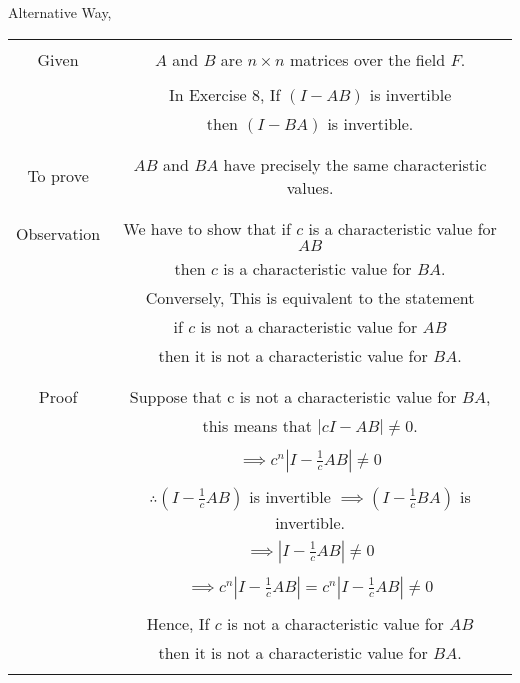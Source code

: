 \documentclass[journal,12pt,twocolumn]{IEEEtran}
\begin{document}
Alternative Way, 
\begin{table}[h!]
\begin{center}
\resizebox{\columnwidth}{!}
{
\begin{tabular}{|c|c|}
\hline
& \\
Given & $A$ and $B$ are $n \times n$ matrices over the field $F$.\\
& \\
& In Exercise 8, If $(I-AB)$ is invertible\\
& then $(I-BA)$ is invertible.\\
&\\
\hline
& \\
To prove & $AB$ and $BA$ have precisely the same characteristic values.\\
& \\
\hline
&\\
Observation & We have to show that if $c$ is a characteristic value for $AB$ \\
& then $c$ is a characteristic value for $BA$.\\
& Conversely, This is equivalent to the statement\\
& if $c$ is not a characteristic value for $AB$\\
& then it is not a characteristic value for $BA$.\\
& \\
\hline
& \\
Proof  & Suppose that c is not a characteristic value for $BA$,\\
& this means that $|cI-AB|\neq0$.\\
& \\
& $\implies c^n|I-\frac{1}{c}AB|\neq0$\\
& \\
& $\therefore (I-\frac{1}{c}AB)$ is invertible $\implies (I-\frac{1}{c}BA)$ is invertible.\\
& $\implies |I-\frac{1}{c}AB|\neq0$\\
& \\
& $\implies c^n|I-\frac{1}{c}AB|=c^n|I-\frac{1}{c}AB|\neq0$\\
& \\
& Hence, If $c$ is not a characteristic value for $AB$\\
& then it is not a characteristic value for $BA$.\\
& \\
\hline
\end{tabular}
}
\end{center}
\end{table}
\end{document}
